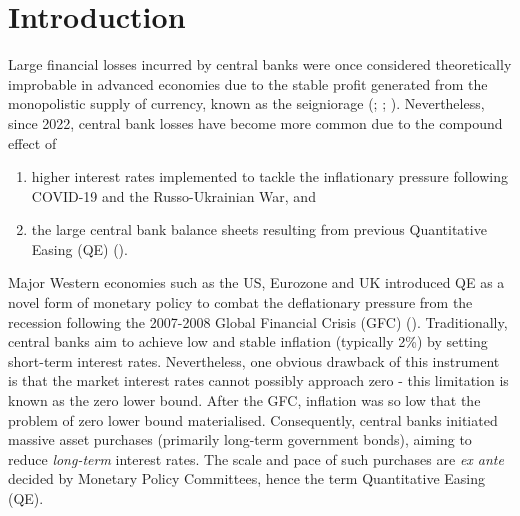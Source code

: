 \documentclass[
  a4paper,
  abstract=true]{scrartcl}
\theoremstyle{definition}
\begin{document}
\section{Introduction}\label{introduction}

\setcounter{page}{1}

Large financial losses incurred by central banks were once considered
theoretically improbable in advanced economies due to the stable profit
generated from the monopolistic supply of currency, known as the
seigniorage (;
;
). Nevertheless, since 2022,
central bank losses have become more common due to the compound effect
of

\begin{enumerate}
\def\labelenumi{\arabic{enumi}.}
\item
  higher interest rates implemented to tackle the inflationary pressure
  following COVID-19 and the Russo-Ukrainian War, and
\item
  the large central bank balance sheets resulting from previous
  Quantitative Easing (QE) ().
\end{enumerate}

Major Western economies such as the US, Eurozone and UK introduced QE as
a novel form of monetary policy to combat the deflationary pressure from
the recession following the 2007-2008 Global Financial Crisis (GFC)
(). Traditionally, central
banks aim to achieve low and stable inflation (typically 2\%) by setting
short-term interest rates. Nevertheless, one obvious drawback of this
instrument is that the market interest rates cannot possibly approach
zero - this limitation is known as the zero lower bound. After the GFC,
inflation was so low that the problem of zero lower bound materialised.
Consequently, central banks initiated massive asset purchases (primarily
long-term government bonds), aiming to reduce \emph{long-term} interest
rates. The scale and pace of such purchases are \emph{ex ante} decided
by Monetary Policy Committees, hence the term Quantitative Easing (QE).
\end{document}
